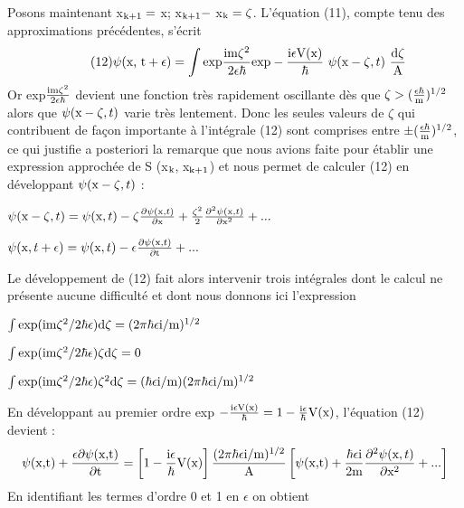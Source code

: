 Posons maintenant
x$_{\text{k+1}} =$ x; x$_{\text{k+1}} -$ x$_{\text{k}}=\zeta$.
L'équation (11), compte tenu des approximations précédentes, s'écrit
\[
\tag{12}\psi(\text{x, t}+\epsilon) = \int 
\text{exp}\frac{\text{im}\zeta^2}{2\epsilon\hbar}
\text{exp}-\frac{\text{i}\epsilon\text{V(x)}}{\hbar}
\ \psi(\text{x}-\zeta,t)\ \frac{\text{d}\zeta}{\text{A}}
\]
Or exp$\frac{\text{im}\zeta^2}{2\epsilon\hbar}$ devient une fonction très rapidement oscillante dès que
$\zeta > (\frac{\epsilon\hbar}{\text{m}})^{1/2}$
alors que $\psi(\text{x}-\zeta,t)$ varie très lentement. Donc les seules
valeurs de $\zeta$ qui contribuent de façon importante à l'intégrale (12) sont
comprises entre $\pm(\frac{\epsilon\hbar}{\text{m}})^{1/2}$, ce qui justifie a posteriori la remarque que
nous avions faite pour établir une expression approchée de S (x$_{\text{k}}$, x$_{\text{k+1}}$) et
nous permet de calculer (12) en développant $\psi(\text{x}-\zeta,t)$ :
\begin{center}
$\psi(\text{x}-\zeta,t) = \psi(\text{x},t)-\zeta\frac{\partial\psi(\text{x},t)}{\partial\text{x}}
+\frac{\zeta^2}{2}\frac{\partial^2\psi(\text{x},t)}{\partial\text{x}^2} + ...$

$\psi(\text{x},t+\epsilon) = \psi(\text{x},t)-\epsilon\frac{\partial\psi(\text{x},t)}{\partial\text{t}} + ...$
\end{center}

Le développement de (12) fait alors intervenir trois intégrales
dont le calcul ne présente aucune difficulté et dont nous donnons ici
l'expression
\begin{center}$
\int\text{exp}(\text{im}\zeta^2/2\hbar\epsilon)\text{d}\zeta = (2\pi\hbar\epsilon\text{i/m})^{1/2}$
\end{center}
\begin{center}
$\int\text{exp}(\text{im}\zeta^2/2\hbar\epsilon)\zeta\text{d}\zeta = 0$
\end{center}
\begin{center}
$\int\text{exp}(\text{im}\zeta^2/2\hbar\epsilon)\zeta^2\text{d}\zeta =
(\hbar\epsilon\text{i/m})(2\pi\hbar\epsilon\text{i/m})^{1/2}
$\end{center}
En développant au premier ordre exp
$-\frac{\text{i}\epsilon\text{V(x)}}{\hbar}=1-\frac{\text{i}\epsilon}{\hbar}\text{V(x)}$, l'équation
(12) devient : 
\[
\psi(\text{x,t})+\frac{\epsilon\partial\psi(\text{x,t})}{\partial\text{t}} =
\left[1-\frac{\text{i}\epsilon}{\hbar}\text{V(x)}\right]
\frac{(2\pi\hbar\epsilon\text{i/m})^{1/2}}{\text{A}}
\left[\psi(\text{x,t})+\frac{\hbar\epsilon\text{i}}{2\text{m}}
\frac{\partial^2\psi(\text{x},t)}{\partial\text{x}^2}+...\right]
\]
En identifiant les termes d'ordre 0 et 1 en $\epsilon$ on obtient

